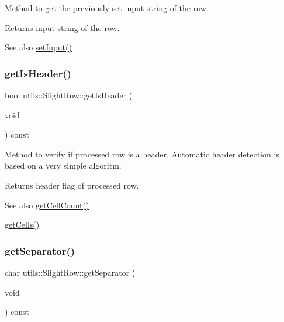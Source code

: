 Method to get the previously set input string of the row. \begin{DoxyReturn}{Returns}
input string of the row. 
\end{DoxyReturn}
\begin{DoxySeeAlso}{See also}
\hyperlink{classutils_1_1SlightRow_abb27b43d2dbe46d47805c05f7b87ab82}{set\+Input()} 
\end{DoxySeeAlso}
\mbox{\label{classutils_1_1SlightRow_a702f97c32ea40303cd83a540404a6eca}} 
\subsubsection{\texorpdfstring{get\+Is\+Header()}{getIsHeader()}}
{\footnotesize\ttfamily bool utils\+::\+Slight\+Row\+::get\+Is\+Header (\begin{DoxyParamCaption}\item[{void}]{ }\end{DoxyParamCaption}) const}

Method to verify if processed row is a header. Automatic header detection is based on a very simple algoritm. \begin{DoxyReturn}{Returns}
header flag of processed row. 
\end{DoxyReturn}
\begin{DoxySeeAlso}{See also}
\hyperlink{classutils_1_1SlightRow_af7df52464ce8151d7c3c429d0a796c7f}{get\+Cell\+Count()} 

\hyperlink{classutils_1_1SlightRow_ab06e2a27035951ff80edf834b430c829}{get\+Cells()} 
\end{DoxySeeAlso}
\mbox{\label{classutils_1_1SlightRow_a1095fd58142659bd85871622ab3d9b1c}} 
\subsubsection{\texorpdfstring{get\+Separator()}{getSeparator()}}
{\footnotesize\ttfamily char utils\+::\+Slight\+Row\+::get\+Separator (\begin{DoxyParamCaption}\item[{void}]{ }\end{DoxyParamCaption}) const}

